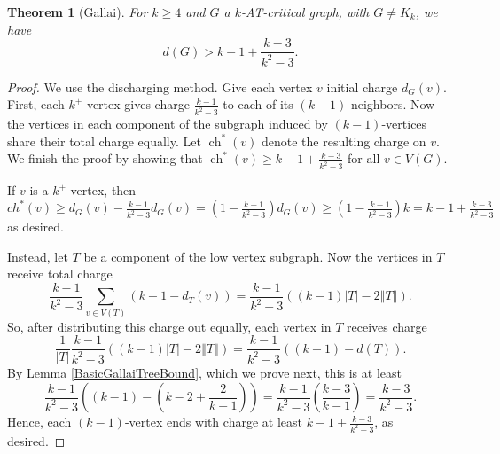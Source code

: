 \documentclass[12pt]{article}
\theoremstyle{plain}
\newtheorem{thm}{Theorem}[section]
\theoremstyle{definition}
\theoremstyle{remark}
\newcommand{\size}[1]{\left\Vert#1\right\Vert}
\newcommand{\parens}[1]{\left( #1 \right)}
\newcommand{\ch}{\operatorname{ch}}
\begin{document}
\begin{thm}[Gallai]
\label{thm:Gallai}
	For $k \ge 4$ and $G$ a $k$-AT-critical graph, with $G \ne K_k$, we have
	\[d(G) > k-1 + \frac{k-3}{k^2-3}.\]
\end{thm}
\begin{proof}
We use the discharging method. Give each vertex $v$ initial charge $d_G(v)$. 
First, each $k^+$-vertex gives charge $\frac{k-1}{k^2-3}$ to each of its
$(k-1)$-neighbors.  Now the vertices in each component of the subgraph induced
by $(k-1)$-vertices share their total charge equally.  Let $\ch^*(v)$ denote the
resulting charge on $v$.  We finish the proof by showing that $\ch^*(v) \ge k-1
+ \frac{k-3}{k^2-3}$ for all $v \in V(G)$.
	
If $v$ is a $k^+$-vertex, then $ch^*(v) \ge d_G(v) - \frac{k-1}{k^2-3}d_G(v) =
\parens{1- \frac{k-1}{k^2-3}}d_G(v) \ge \parens{1- \frac{k-1}{k^2-3}}k = k-1 +
\frac{k-3}{k^2-3}$ as desired.

Instead, let $T$ be a component of the low vertex subgraph.  Now the vertices
in $T$ receive total charge 
\[\frac{k-1}{k^2-3}\sum_{v \in V(T)} (k-1 - d_T(v)) =
\frac{k-1}{k^2-3}\parens{(k-1)|T| - 2\size{T}}.\]
So, after distributing this charge out equally, each vertex in $T$ receives charge
\[\frac{1}{|T|}\frac{k-1}{k^2-3}((k-1)|T| - 2\size{T}) = \frac{k-1}{k^2-3}\parens{(k-1) - d(T)}.\]
By Lemma \ref{BasicGallaiTreeBound}, which we prove next, this is at least
\[\frac{k-1}{k^2-3}\parens{(k-1) - \parens{k-2 + \frac{2}{k-1}}} = \frac{k-1}{k^2-3}\parens{\frac{k-3}{k-1}} = \frac{k-3}{k^2-3}.\]
Hence, each $(k-1)$-vertex ends with charge at least $k-1 + \frac{k-3}{k^2-3}$, as desired.
\end{proof}
\end{document}
